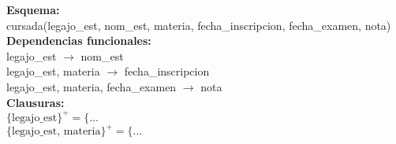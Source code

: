 \documentclass[preview]{standalone}
\begin{document}
\textbf{Esquema:}\\
cursada(legajo\_est, nom\_est, materia, fecha\_inscripcion, fecha\_examen, nota)\\

\textbf{Dependencias funcionales:}\\
legajo\_est $\rightarrow$ nom\_est\\
legajo\_est, materia $\rightarrow$ fecha\_inscripcion\\
legajo\_est, materia, fecha\_examen $\rightarrow$ nota\\

\textbf{Clausuras:}\\
$\big\{\text{legajo\_est}\big\}^+ = \big\{\dots$\\
$\big\{\text{legajo\_est, materia}\big\}^+ = \big\{\dots$
\end{document}
